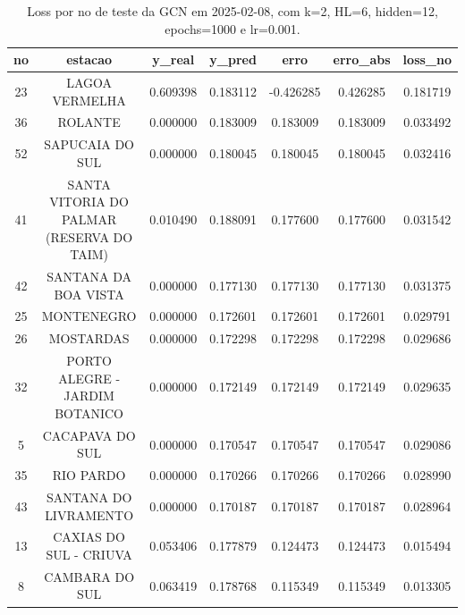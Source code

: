 \begin{table}[h]
\centering
\caption{Loss por no de teste da GCN em 2025-02-08, com k=2, HL=6, hidden=12, epochs=1000 e lr=0.001.}
\label{tab:gcn_loss_k2_hl6_h12_e1000_d20250208}
\begin{tabular}{ccccccc}
\toprule
no & estacao & y\_real & y\_pred & erro & erro\_abs & loss\_no \\
\midrule
23 & LAGOA VERMELHA & 0.609398 & 0.183112 & -0.426285 & 0.426285 & 0.181719 \\
36 & ROLANTE & 0.000000 & 0.183009 & 0.183009 & 0.183009 & 0.033492 \\
52 & SAPUCAIA DO SUL & 0.000000 & 0.180045 & 0.180045 & 0.180045 & 0.032416 \\
41 & SANTA VITORIA DO PALMAR (RESERVA DO TAIM) & 0.010490 & 0.188091 & 0.177600 & 0.177600 & 0.031542 \\
42 & SANTANA DA BOA VISTA & 0.000000 & 0.177130 & 0.177130 & 0.177130 & 0.031375 \\
25 & MONTENEGRO & 0.000000 & 0.172601 & 0.172601 & 0.172601 & 0.029791 \\
26 & MOSTARDAS & 0.000000 & 0.172298 & 0.172298 & 0.172298 & 0.029686 \\
32 & PORTO ALEGRE - JARDIM BOTANICO & 0.000000 & 0.172149 & 0.172149 & 0.172149 & 0.029635 \\
5 & CACAPAVA DO SUL & 0.000000 & 0.170547 & 0.170547 & 0.170547 & 0.029086 \\
35 & RIO PARDO & 0.000000 & 0.170266 & 0.170266 & 0.170266 & 0.028990 \\
43 & SANTANA DO LIVRAMENTO & 0.000000 & 0.170187 & 0.170187 & 0.170187 & 0.028964 \\
13 & CAXIAS DO SUL - CRIUVA & 0.053406 & 0.177879 & 0.124473 & 0.124473 & 0.015494 \\
8 & CAMBARA DO SUL & 0.063419 & 0.178768 & 0.115349 & 0.115349 & 0.013305 \\
\bottomrule
\end{tabular}
\end{table}
